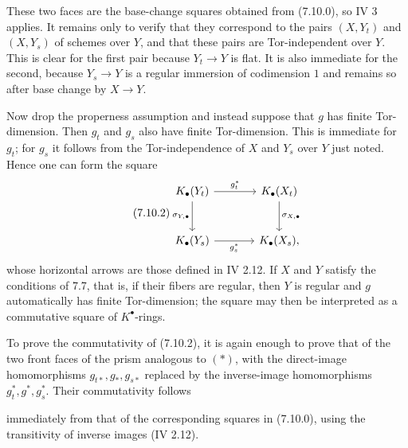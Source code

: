 These two faces are the base-change squares obtained from (7.10.0), so IV 3
applies. It remains only to verify that they correspond to the pairs
$(X,Y_t)$ and $(X,Y_s)$ of schemes over $Y$, and that these pairs are
Tor-independent over $Y$. This is clear for the first pair because
$Y_t\to Y$ is flat. It is also immediate for the second, because
$Y_s\to Y$ is a regular immersion of codimension $1$ and remains so after
base change by $X\to Y$.

Now drop the properness assumption and instead suppose that $g$ has finite
Tor-dimension. Then $g_t$ and $g_s$ also have finite Tor-dimension. This is
immediate for $g_t$; for $g_s$ it follows from the Tor-independence of
$X$ and $Y_s$ over $Y$ just noted. Hence one can form the square
\begin{equation}\tag{7.10.2}
\begin{tikzcd}[column sep=large,row sep=large]
K_\bullet(Y_t) \arrow[r,"g_t^*"] \arrow[d,"\sigma_{Y,\bullet}"'] &
K_\bullet(X_t) \arrow[d,"\sigma_{X,\bullet}"]\\
K_\bullet(Y_s) \arrow[r,"g_s^*"'] & K_\bullet(X_s),
\end{tikzcd}
\end{equation}
whose horizontal arrows are those defined in IV 2.12. If $X$ and $Y$
satisfy the conditions of 7.7, that is, if their fibers are regular, then
$Y$ is regular and $g$ automatically has finite Tor-dimension; the square
may then be interpreted as a commutative square of $K^\bullet$-rings.

To prove the commutativity of (7.10.2), it is again enough to prove that of
the two front faces of the prism analogous to $(*)$, with the direct-image
homomorphisms $g_{t*},g_*,g_{s*}$ replaced by the inverse-image
homomorphisms $g_t^*,g^*,g_s^*$. Their commutativity follows

immediately from that of the corresponding squares in (7.10.0), using the
transitivity of inverse images (IV 2.12).

